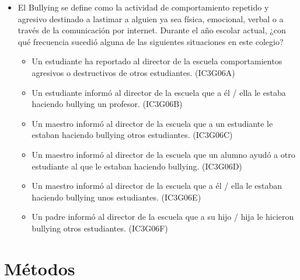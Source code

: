 \documentclass[12pt,twoside]{templates/facsothesis}
\providecommand{\tightlist}{%
  \setlength{\itemsep}{0pt}\setlength{\parskip}{0pt}}
\begin{document}
\begin{itemize}
\item
  El Bullying se define como la actividad de comportamiento repetido y agresivo destinado a lastimar a alguien ya sea física, emocional, verbal o a través de la comunicación por internet. Durante el año escolar actual, ¿con qué frecuencia sucedió alguna de las siguientes situaciones en este colegio?

  \begin{itemize}
  \tightlist
  \item
    Un estudiante ha reportado al director de la escuela comportamientos agresivos o destructivos de otros estudiantes. (IC3G06A)
  \item
    Un estudiante informó al director de la escuela que a él / ella le estaba haciendo bullying un profesor. (IC3G06B)
  \item
    Un maestro informó al director de la escuela que a un estudiante le estaban haciendo bullying otros estudiantes. (IC3G06C)
  \item
    Un maestro informó al director de la escuela que un alumno ayudó a otro estudiante al que le estaban haciendo bullying. (IC3G06D)
  \item
    Un maestro informó al director de la escuela que a él / ella le estaban haciendo bullying unos estudiantes. (IC3G06E)
  \item
    Un padre informó al director de la escuela que a su hijo / hija le hicieron bullying otros estudiantes. (IC3G06F)
  \end{itemize}
\end{itemize}

\hypertarget{muxe9todos}{%
\section{Métodos}\label{muxe9todos}}
\end{document}
